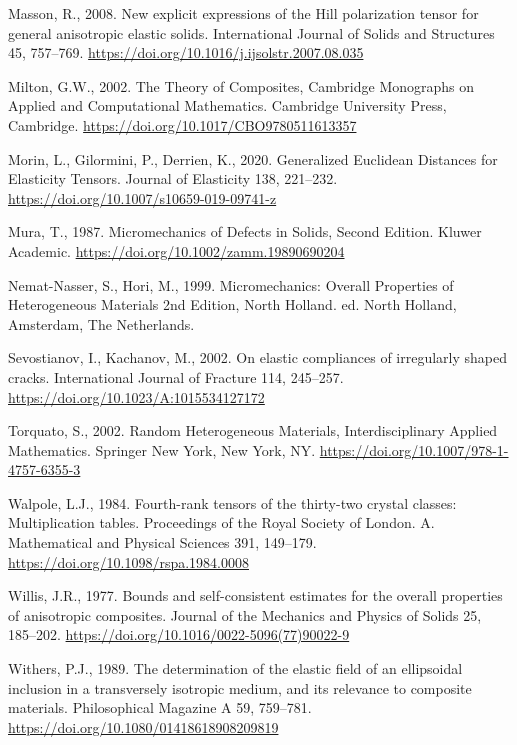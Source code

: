 \documentclass[
  letterpaper,
  DIV=11,
  numbers=noendperiod]{scrreprt}
\newlength{\cslhangindent}
\newenvironment{CSLReferences}[2] %
 {\begin{list}{}{%
  \setlength{\itemindent}{0pt}
  \setlength{\leftmargin}{0pt}
  \setlength{\parsep}{0pt}
  \ifodd #1
   \setlength{\leftmargin}{\cslhangindent}
   \setlength{\itemindent}{-1\cslhangindent}
  \fi
  \setlength{\itemsep}{#2\baselineskip}}}
 {\end{list}}
\begin{document}
\begin{CSLReferences}{1}{0}
Masson, R., 2008. New explicit expressions of the {Hill} polarization
tensor for general anisotropic elastic solids. International Journal of
Solids and Structures 45, 757--769.
\url{https://doi.org/10.1016/j.ijsolstr.2007.08.035}

Milton, G.W., 2002. The {Theory} of {Composites}, Cambridge {Monographs}
on {Applied} and {Computational Mathematics}. Cambridge University
Press, Cambridge. \url{https://doi.org/10.1017/CBO9780511613357}

Morin, L., Gilormini, P., Derrien, K., 2020. Generalized {Euclidean
Distances} for {Elasticity Tensors}. Journal of Elasticity 138,
221--232. \url{https://doi.org/10.1007/s10659-019-09741-z}

Mura, T., 1987. Micromechanics of {Defects} in {Solids}, {Second
Edition}. Kluwer Academic.
\url{https://doi.org/10.1002/zamm.19890690204}

Nemat-Nasser, S., Hori, M., 1999. Micromechanics: {Overall Properties}
of {Heterogeneous Materials} 2nd {Edition}, North Holland. ed. North
Holland, Amsterdam, The Netherlands.

Sevostianov, I., Kachanov, M., 2002. On elastic compliances of
irregularly shaped cracks. International Journal of Fracture 114,
245--257. \url{https://doi.org/10.1023/A:1015534127172}

Torquato, S., 2002. Random {Heterogeneous Materials}, Interdisciplinary
{Applied Mathematics}. Springer New York, New York, NY.
\url{https://doi.org/10.1007/978-1-4757-6355-3}

Walpole, L.J., 1984. Fourth-rank tensors of the thirty-two crystal
classes: Multiplication tables. Proceedings of the Royal Society of
London. A. Mathematical and Physical Sciences 391, 149--179.
\url{https://doi.org/10.1098/rspa.1984.0008}

Willis, J.R., 1977. Bounds and self-consistent estimates for the overall
properties of anisotropic composites. Journal of the Mechanics and
Physics of Solids 25, 185--202.
\url{https://doi.org/10.1016/0022-5096(77)90022-9}

Withers, P.J., 1989. The determination of the elastic field of an
ellipsoidal inclusion in a transversely isotropic medium, and its
relevance to composite materials. Philosophical Magazine A 59, 759--781.
\url{https://doi.org/10.1080/01418618908209819}

\end{CSLReferences}
\end{document}
